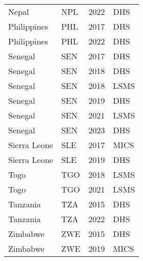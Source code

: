 \begin{table}[ht]
\begin{tabular}{llrl}
  Nepal & NPL & 2022 & DHS \\ 
  Philippines & PHL & 2017 & DHS \\ 
  Philippines & PHL & 2022 & DHS \\ 
  Senegal & SEN & 2017 & DHS \\ 
  Senegal & SEN & 2018 & DHS \\ 
  Senegal & SEN & 2018 & LSMS \\ 
  Senegal & SEN & 2019 & DHS \\ 
  Senegal & SEN & 2021 & LSMS \\ 
  Senegal & SEN & 2023 & DHS \\ 
  Sierra Leone & SLE & 2017 & MICS \\ 
  Sierra Leone & SLE & 2019 & DHS \\ 
  Togo & TGO & 2018 & LSMS \\ 
  Togo & TGO & 2021 & LSMS \\ 
  Tanzania & TZA & 2015 & DHS \\ 
  Tanzania & TZA & 2022 & DHS \\ 
  Zimbabwe & ZWE & 2015 & DHS \\ 
  Zimbabwe & ZWE & 2019 & MICS \\ 
   \hline
\end{tabular}
\end{table}
